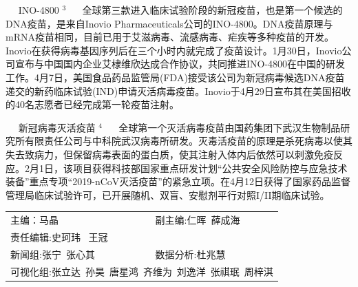 \documentclass[
]{article}
\begin{document}
\(\quad\) INO-4800 \(^3\) \(\quad\)
全球第三款进入临床试验阶段的新冠疫苗，也是第一个候选的DNA疫苗，是来自Inovio
Pharmaceuticals公司的INO-4800。DNA疫苗原理与mRNA疫苗相同，目前已用于艾滋病毒、流感病毒、疟疾等多种疫苗的开发。Inovio在获得病毒基因序列后在三个小时内就完成了疫苗设计。1月30日，Inovio公司宣布与中国国内企业艾棣维欣达成合作协议，共同推进INO-4800在中国的研发工作。4月7日，美国食品药品监管局(FDA)接受该公司为新冠病毒候选DNA疫苗递交的新药临床试验(IND)申请灭活病毒疫苗。Inovio于4月29日宣布其在美国招收的40名志愿者已经完成第一轮疫苗注射。

\(\quad\) 新冠病毒灭活疫苗 \(^4\) \(\quad\)
全球第一个灭活病毒疫苗由国药集团下武汉生物制品研究所有限责任公司与中科院武汉病毒所研发。灭毒活疫苗的原理是杀死病毒以使其失去致病力，但保留病毒表面的蛋白质，使其注射入体内后依然可以刺激免疫反应。2月1日，该项目获得科技部国家重点研发计划``公共安全风险防控与应急技术装备''重点专项``2019-nCoV灭活疫苗''的紧急立项。在4月12日获得了国家药品监督管理局临床试验许可，已开展随机、双盲、安慰剂平行对照I/II期临床试验。

\vspace{5mm}

\centering
\small
\begin{tabular}{ll}

主编：马晶  &  副主编:仁晖\,  薛成海  \\
责任编辑:史珂玮 \, 王冠  \\
新闻组:张宁\, 张心其  & 数据分析:杜兆慧 \\
\multicolumn{2}{l}{可视化组:张立达\, 孙昊\, 唐星鸿\, 齐维为\, 刘逸洋\, 张祺珉\, 周梓淇}

\end{tabular}
\end{document}
